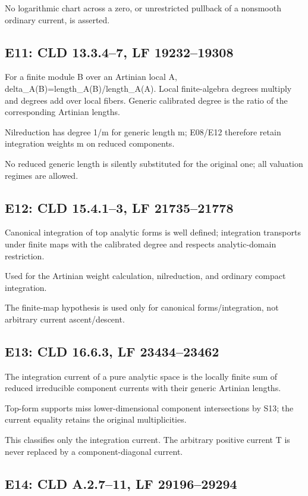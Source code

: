 \documentclass[11pt]{article}
\begin{document}
No logarithmic chart across a zero, or unrestricted pullback of a nonsmooth ordinary current, is asserted.

\subsection*{E11: CLD 13.3.4--7, LF 19232--19308}

For a finite module B over an Artinian local A, delta\_A(B)=length\_A(B)/length\_A(A). Local finite-algebra degrees multiply and degrees add over local fibers. Generic calibrated degree is the ratio of the corresponding Artinian lengths.

Nilreduction has degree 1/m for generic length m; E08/E12 therefore retain integration weights m on reduced components.

No reduced generic length is silently substituted for the original one; all valuation regimes are allowed.

\subsection*{E12: CLD 15.4.1--3, LF 21735--21778}

Canonical integration of top analytic forms is well defined; integration transports under finite maps with the calibrated degree and respects analytic-domain restriction.

Used for the Artinian weight calculation, nilreduction, and ordinary compact integration.

The finite-map hypothesis is used only for canonical forms/integration, not arbitrary current ascent/descent.

\subsection*{E13: CLD 16.6.3, LF 23434--23462}

The integration current of a pure analytic space is the locally finite sum of reduced irreducible component currents with their generic Artinian lengths.

Top-form supports miss lower-dimensional component intersections by S13; the current equality retains the original multiplicities.

This classifies only the integration current. The arbitrary positive current T is never replaced by a component-diagonal current.

\subsection*{E14: CLD A.2.7--11, LF 29196--29294}
\end{document}
